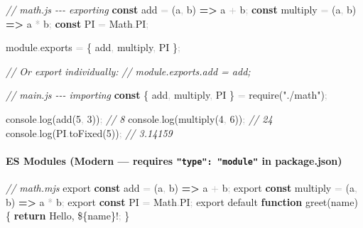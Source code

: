 \documentclass[
  justified,
  openright,
]{tufte-book}
\let\subsection\paragraph
\let\paragraph\paragraph
\newcommand{\KeywordTok}[1]{\textcolor{CodeKeyword}{\textbf{#1}}}  %
\newcommand{\StringTok}[1]{\textcolor{CodeString}{#1}}              %
\newcommand{\CommentTok}[1]{\textcolor{CodeComment}{\textit{#1}}}  %
\newcommand{\CodeNumTok}[1]{\textcolor{CodeNumber}{#1}}             %
\newcommand{\CodeFuncTok}[1]{\textcolor{CodeKeyword}{#1}}           %
\newcommand{\CodeTypeTok}[1]{\textcolor{CodeType}{#1}}              %
\newcommand{\CodeAccentTok}[1]{\textcolor{CodeAccent}{#1}}          %
\newcommand{\OperatorTok}[1]{\textcolor{DarkGray}{#1}}              %
\newenvironment{Shaded}{%
  \begin{mdframed}[style=TufteCode]%
}{%
  \end{mdframed}%
}
\let\subsection\paragraph
\let\paragraph\paragraph
\begin{document}
\begin{Shaded}
\begin{Highlighting}[]
\CommentTok{// math.js {-}{-}{-} exporting}
\KeywordTok{const} add \OperatorTok{=} (a\OperatorTok{,} b) \KeywordTok{=\textgreater{}} a \OperatorTok{+} b\OperatorTok{;}
\KeywordTok{const} multiply \OperatorTok{=} (a\OperatorTok{,} b) \KeywordTok{=\textgreater{}} a \OperatorTok{*} b\OperatorTok{;}
\KeywordTok{const} \CodeNumTok{PI} \OperatorTok{=} Math\OperatorTok{.}\CodeNumTok{PI}\OperatorTok{;}
 
module\OperatorTok{.}\CodeTypeTok{exports} \OperatorTok{=} \{ add\OperatorTok{,} multiply\OperatorTok{,} \CodeNumTok{PI} \}\OperatorTok{;}
 
\CommentTok{// Or export individually:}
\CommentTok{// module.exports.add = add;}
\end{Highlighting}
\end{Shaded}

\begin{Shaded}
\begin{Highlighting}[]
\CommentTok{// main.js {-}{-}{-} importing}
\KeywordTok{const} \{ add\OperatorTok{,} multiply\OperatorTok{,} \CodeNumTok{PI} \} \OperatorTok{=} \CodeAccentTok{require}(\StringTok{"./math"})\OperatorTok{;}
 
console\OperatorTok{.}\CodeFuncTok{log}(\CodeFuncTok{add}(\CodeNumTok{5}\OperatorTok{,} \CodeNumTok{3}))\OperatorTok{;} \CommentTok{// 8}
console\OperatorTok{.}\CodeFuncTok{log}(\CodeFuncTok{multiply}(\CodeNumTok{4}\OperatorTok{,} \CodeNumTok{6}))\OperatorTok{;} \CommentTok{// 24}
console\OperatorTok{.}\CodeFuncTok{log}(\CodeNumTok{PI}\OperatorTok{.}\CodeFuncTok{toFixed}(\CodeNumTok{5}))\OperatorTok{;} \CommentTok{// 3.14159}
\end{Highlighting}
\end{Shaded}

\subsection{\texorpdfstring{ES Modules (Modern --- requires
\texttt{"type":\ "module"} in
package.json)}{ES Modules (Modern --- requires "type": "module" in package.json)}}\label{es-modules-modern-requires-type-module-in-package.json}

\begin{Shaded}
\begin{Highlighting}[]
\CommentTok{// math.mjs}
\CodeAccentTok{export} \KeywordTok{const} add \OperatorTok{=} (a\OperatorTok{,} b) \KeywordTok{=\textgreater{}} a \OperatorTok{+} b\OperatorTok{;}
\CodeAccentTok{export} \KeywordTok{const} multiply \OperatorTok{=} (a\OperatorTok{,} b) \KeywordTok{=\textgreater{}} a \OperatorTok{*} b\OperatorTok{;}
\CodeAccentTok{export} \KeywordTok{const} \CodeNumTok{PI} \OperatorTok{=} Math\OperatorTok{.}\CodeNumTok{PI}\OperatorTok{;}
\CodeAccentTok{export} \CodeAccentTok{default} \KeywordTok{function} \CodeFuncTok{greet}(name) \{
  \KeywordTok{return} \StringTok{\textasciigrave{}Hello, }\StringTok{\$\{}name\StringTok{\}}\StringTok{!\textasciigrave{}}\OperatorTok{;}
\}
\end{Highlighting}
\end{Shaded}
\end{document}
